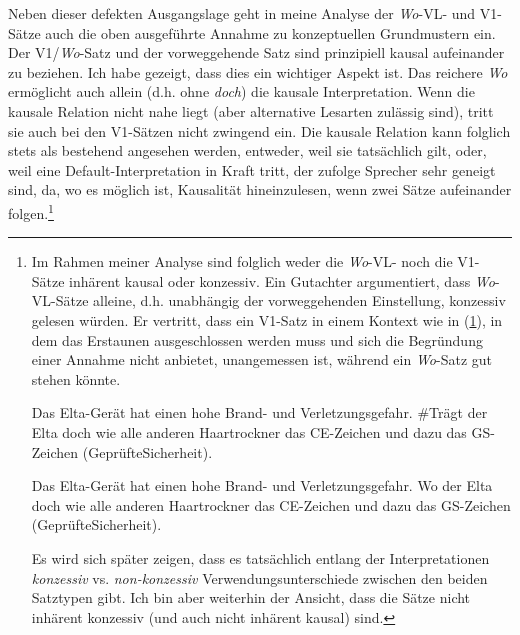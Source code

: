 {Neben dieser \glq defekten\grq {} Ausgangslage geht in meine Analyse der \textit{Wo}-VL- und V1-Sätze auch die oben ausgeführte Annahme zu konzeptuellen Grundmustern  ein. Der V1/\textit{Wo}-Satz und der vorweggehende Satz sind prinzipiell kausal aufeinander zu beziehen. Ich habe gezeigt, dass dies ein wichtiger Aspekt ist. Das \glq rei\-chere\grq {} \textit{Wo} ermöglicht auch allein (d.h. ohne \textit{doch}) die kausale Interpretation. Wenn die kausale Relation nicht nahe liegt (aber alternative Lesarten zulässig sind), tritt sie auch bei den V1-Sätzen nicht zwingend ein. Die kausale Relation kann folglich stets als bestehend angesehen werden, entweder, weil sie tatsächlich gilt, oder, weil eine Default-Interpretation in Kraft tritt, der zufolge Sprecher sehr geneigt sind, da, wo es möglich ist, Kausalität hineinzulesen, wenn zwei Sätze aufeinander folgen.\footnote{Im Rahmen meiner Analyse sind folglich weder die \textit{Wo}-VL- noch die V1-Sätze inhärent kausal oder konzessiv. Ein Gutachter argumentiert, dass \textit{Wo}-VL-Sätze alleine, d.h. unabhängig der vorweggehenden Einstellung, konzessiv gelesen würden. Er vertritt, dass ein V1-Satz in einem Kontext wie in (\ref{1037}), in dem das Erstaunen ausgeschlossen werden muss und sich die Begründung einer Annahme nicht anbietet, unangemessen ist, während ein \textit{Wo}-Satz gut stehen könnte. 

\begin{exe}
	\ex\label{1037}
	Das Elta-Gerät hat einen hohe Brand- und Verletzungsgefahr. \#Trägt der Elta doch wie alle anderen Haartrockner das CE-Zeichen und dazu das GS-Zeichen 		(GeprüfteSicherheit).   
\end{exe}

\begin{exe}
	\ex\label{1038}
	Das Elta-Gerät hat einen hohe Brand- und Verletzungsgefahr. Wo der Elta doch wie alle anderen Haartrockner das CE-Zeichen und dazu das GS-Zeichen 		(GeprüfteSicherheit).  
\end{exe}
Es wird sich später zeigen, dass es tatsächlich entlang der Interpretationen \textit{konzessiv} vs. \textit{non-konzessiv} Verwendungsunterschiede zwischen den beiden Satztypen gibt. Ich bin aber weiterhin der Ansicht, dass die Sätze nicht inhärent konzessiv (und auch nicht inhärent kausal) sind.
}

}
